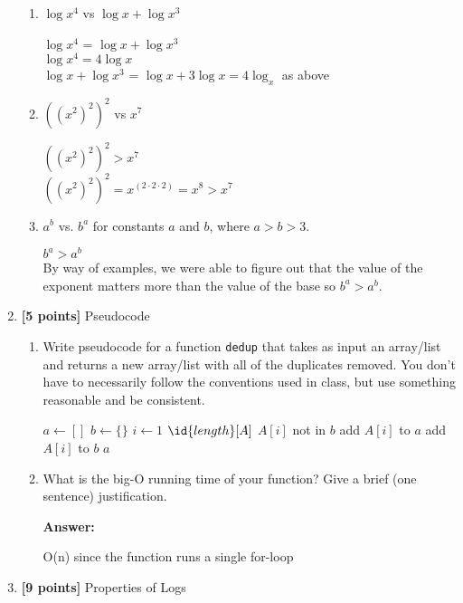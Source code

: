 \documentclass[11pt]{article}
\begin{document}
\begin{enumerate}
\begin{enumerate}
\item $\log x^4$ vs $\log x + \log x^3$

    $\log x^4$ = $\log x + \log x^3$ \\
    $\log x^4 = 4 \log x$ \\
    $\log x + \log x^3$ = $\log x + 3\log x = 4 \log_x$ as above


\item $((x^2)^2)^2$ vs $x^7$

     $((x^2)^2)^2 > x^7$ \\
      $((x^2)^2)^2 = x^(2\cdot2\cdot2) = x^8 > x^7$


\item $a^b$ vs. $b^a$ for constants $a$ and $b$, where $a > b > 3$.

    $b^a > a^b$ \\
    By way of examples, we were able to figure out that the value of the exponent matters more than the value of the base so $b^a > a^b$.

\end{enumerate}


\item \textbf{[5 points]} Pseudocode

\begin{enumerate}

\item Write pseudocode for a function \texttt{dedup} that takes as input an array/list and returns a new array/list with all of the duplicates removed.  You don't have to necessarily follow the conventions used in class, but use something reasonable and be consistent. 
\begin{codebox}
    \li $a \gets []$
    \li $b \gets \{\}$
    \li \For $i \gets 1$ \To $\id{length}[A]$
    \li	\If $A[i]$ not in  $b$
    \li \hspace{1em} add $A[i]$ to $a$ 
    \li \hspace{1em}  add $A[i]$ to $b$ 
        \End
     \End
    \li \Return $a$
       \end{codebox}

\item What is the big-O running time of your function?  Give a brief (one sentence) justification.

    \textbf{Answer:}
    
    O(n) since the function runs a single for-loop 
\end{enumerate}


\item\textbf{[9 points]} Properties of Logs


\end{enumerate}
\end{document}
